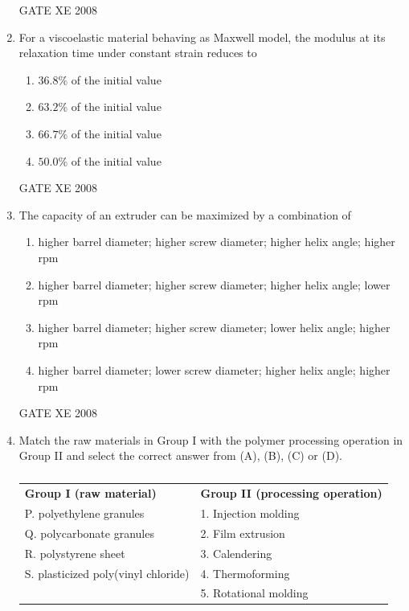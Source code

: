 \documentclass[12pt]{article}
\begin{document}
\begin{enumerate}
\begin{enumerate}
\end{enumerate}

 GATE XE 2008

\item For a viscoelastic material behaving as Maxwell model, the modulus at its relaxation time under constant strain reduces to  

\begin{enumerate}
\item  $36.8\%$ of the initial value  
\item  $63.2\%$ of the initial value  
\item  $66.7\%$ of the initial value  
\item  $50.0\%$ of the initial value 
\end{enumerate}

GATE XE 2008

\item The capacity of an extruder can be maximized by a combination of  

\begin{enumerate}
\item  higher barrel diameter; higher screw diameter; higher helix angle; higher rpm  
\item  higher barrel diameter; higher screw diameter; higher helix angle; lower rpm 
\item  higher barrel diameter; higher screw diameter; lower helix angle; higher rpm 
\item  higher barrel diameter; lower screw diameter; higher helix angle; higher rpm
\end{enumerate}

GATE XE 2008

\item Match the raw materials in Group I with the polymer processing operation in Group II and select the correct answer from (A), (B), (C) or (D).

\begin{table}[H]     \centering     \caption{}     \label{}     \begin{tabular}{l l}
\textbf{Group I (raw material)} & \textbf{Group II (processing operation)} \\
P. polyethylene granules & 1. Injection molding \\
Q. polycarbonate granules & 2. Film extrusion \\
R. polystyrene sheet & 3. Calendering \\
S. plasticized poly(vinyl chloride) & 4. Thermoforming \\
& 5. Rotational molding \\
\end{tabular} \end{table}


\end{enumerate}
\end{document}
